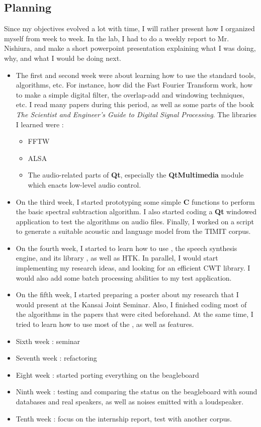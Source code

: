 \subsection{Planning}
Since my objectives evolved a lot with time, I will rather present how I organized myself from week to week.
In the lab, I had to do a weekly report to Mr. Nishiura, and make a short powerpoint presentation explaining what I was doing, why, and what I would be doing next.

\begin{itemize}
\item The first and second week were about learning how to use the standard tools, algorithms, etc. For instance, how did the Fast Fourier Transform work, how to make a simple digital filter, the overlap-add and windowing techniques, etc. I read many papers during this period, as well as some parts of the book \textit{The Scientist and Engineer's Guide to Digital Signal Processing}. The libraries I learned were : 
\begin{itemize}
\item \ac{FFTW}
\item \ac{ALSA}
\item The audio-related parts of \textbf{Qt}, especially the \textbf{QtMultimedia} module which enacts low-level audio control.
\end{itemize}
\item On the third week, I started prototyping some simple \textbf{C} functions to perform the basic spectral subtraction algorithm. I also started coding a \textbf{Qt} windowed application to test the algorithms on audio files. Finally, I worked on a script to generate a suitable acoustic and language model from the \ac{TIMIT} corpus.
\item On the fourth week, I started to learn how to use , the speech synthesis engine, and its library , as well as \ac{HTK}. In parallel, I would start implementing my research ideas, and looking for an efficient \ac{CWT} library. I would also add some batch processing abilities to my test application.
\item On the fifth week, I started preparing a poster about my research that I would present at the Kansai Joint Seminar. Also, I finished coding most of the algorithms in the papers that were cited beforehand. At the same time, I tried to learn how to use most of the  , as well as  features.
\item Sixth week : seminar %
\item Seventh week : refactoring
\item Eight week : started porting everything on the beagleboard
\item Ninth week : testing and comparing the status on the beagleboard with sound databases and real speakers, as well as noises emitted with a loudspeaker.
\item Tenth week : focus on the internship report, test with another corpus.
\end{itemize}
